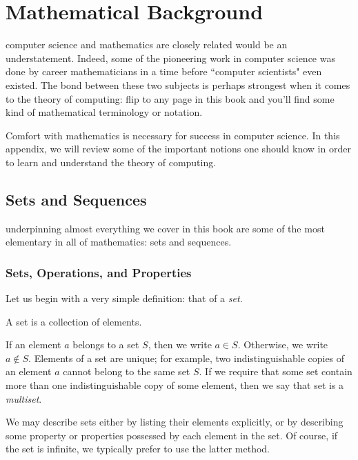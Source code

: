 \chapter{Mathematical Background}\label{app:mathematicalbackground}

 computer science and mathematics are closely related would be an understatement. Indeed, some of the pioneering work in computer science was done by career mathematicians in a time before ``computer scientists" even existed. The bond between these two subjects is perhaps strongest when it comes to the theory of computing: flip to any page in this book and you'll find some kind of mathematical terminology or notation.

Comfort with mathematics is necessary for success in computer science. In this appendix, we will review some of the important notions one should know in order to learn and understand the theory of computing.

\section{Sets and Sequences}

 underpinning almost everything we cover in this book are some of the most elementary in all of mathematics: sets and sequences.

\subsection*{Sets, Operations, and Properties}

Let us begin with a very simple definition: that of a \emph{set}.

\begin{definition}[Set]
A set is a collection of elements.
\end{definition}

If an element $a$ belongs to a set $S$, then we write $a \in S$. Otherwise, we write $a \not\in S$. Elements of a set are unique; for example, two indistinguishable copies of an element $a$ cannot belong to the same set $S$. If we require that some set contain more than one indistinguishable copy of some element, then we say that set is a \emph{multiset}.

We may describe sets either by listing their elements explicitly, or by describing some property or properties possessed by each element in the set. Of course, if the set is infinite, we typically prefer to use the latter method.

